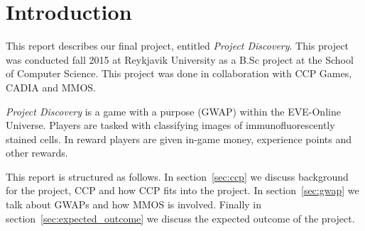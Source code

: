 \section{Introduction}\label{sec:introduction}
This report describes our final project, entitled \emph{Project Discovery}. This
project was conducted fall 2015 at Reykjavik University as a B.Sc project at
the School of Computer Science. This project was done in collaboration with CCP
Games, CADIA and MMOS.

\emph{Project Discovery} is a game with a purpose (GWAP) within the EVE-Online
Universe. Players are tasked with classifying images of immunofluorescently
stained cells. In reward players are given in-game money, experience points and
other rewards.

This report is structured as follows. In section~\ref{sec:ccp} we discuss background 
for the project, CCP and how CCP fits into the project. In section~\ref{sec:gwap} we talk about GWAPs and how MMOS is involved. Finally in section~\ref{sec:expected_outcome} we discuss the expected outcome of the project.

